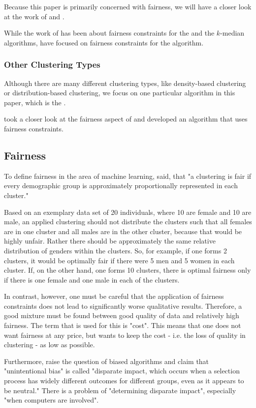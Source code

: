 Because this paper is primarily concerned with fairness, we will have a closer look at the work of \textcite[]{Chierichetti2018} and \textcite[]{Schmidt2018}.

While the work of \textcite[]{Chierichetti2018} has been about fairness constraints for the  and the $k$-median algorithms, \textcite[]{Schmidt2018} have focused on fairness constraints for the  algorithm.

\subsubsection{Other Clustering Types}

Although there are many different clustering types, like density-based clustering or distribution-based clustering, we focus on one particular algorithm in this paper, which is the .

\textcite[]{Kleindessner2019} took a closer look at the fairness aspect of  and developed an algorithm that uses fairness constraints.


\subsection{Fairness}

To define fairness in the area of machine learning, \textcite[1]{Kleindessner2019} said, that "a clustering is fair if every demographic group is approximately proportionally represented in each cluster."

Based on an exemplary data set of 20 individuals, where 10 are female and 10 are male, an applied clustering should not distribute the clusters such that all females are in one cluster and all males are in the other cluster, because that would be highly unfair. Rather there should be approximately the same relative distribution of genders within the clusters. So, for example, if one forms 2 clusters, it would be optimally fair if there were 5 men and 5 women in each cluster. If, on the other hand, one forms 10 clusters, there is optimal fairness only if there is one female and one male in each of the clusters.

In contrast, however, one must be careful that the application of fairness constraints does not lead to significantly worse qualitative results. Therefore, a good mixture must be found between good quality of data and relatively high fairness. The term that is used for this is "cost". This means that one does not want fairness at any price, but wants to keep the cost - i.e. the loss of quality in clustering - as low as possible.

Furthermore, \textcite[1]{Feldman2014CertifyingImpact} raise the question of biased algorithms and claim that "unintentional bias" is called "disparate impact, which occurs when a selection process has widely different outcomes for different groups, even as it appears to be neutral." There is a problem of "determining disparate impact", especially "when computers are involved". \autocite[1]{Feldman2014CertifyingImpact}
